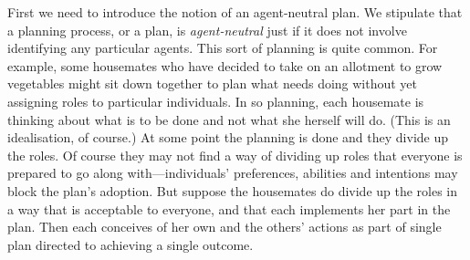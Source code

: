 \documentclass[12pt,\papersize]{extarticle}
\begin{document}

First we need to introduce the notion of an agent-neutral plan.
We stipulate that a planning process, or a plan, is \emph{agent-neutral} just if it does not involve identifying any particular agents.  
This sort of planning is quite common.
For example, some housemates who have decided to take on an allotment to grow vegetables might sit down together to plan what needs doing without yet assigning roles to particular individuals. 
In so planning, each housemate is thinking about what is to be done and not what she herself will do.  
(This is an idealisation, of course.)
At some point the planning is done  and they divide up the roles.
Of course they may not find a way of dividing up roles that everyone is prepared to go along with---individuals' preferences, abilities and intentions may block the plan's adoption.
But suppose the housemates do divide up the roles in a way that is acceptable to everyone, 
	and that each implements her part in the plan.
Then each conceives of her own and the others' actions as part of single plan directed to achieving a single outcome.
\end{document}
